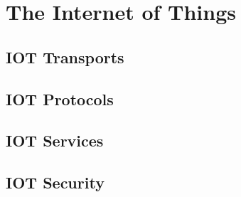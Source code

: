 \chapter{The Internet of Things} 


\section{IOT Transports}
\section{IOT Protocols}
\section{IOT Services}
\section{IOT Security}











%

